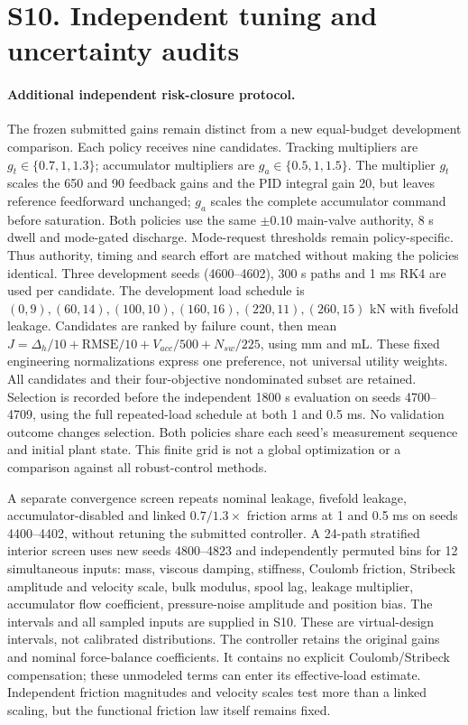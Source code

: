\documentclass[11pt,a4paper]{article}
\begin{document}
\section*{S10. Independent tuning and uncertainty audits}

\paragraph{Additional independent risk-closure protocol.}
The frozen submitted gains remain distinct from a new equal-budget development comparison. Each policy receives nine candidates. Tracking multipliers are $g_t\in\{0.7,1,1.3\}$; accumulator multipliers are $g_a\in\{0.5,1,1.5\}$. The multiplier $g_t$ scales the 650 and 90 feedback gains and the PID integral gain 20, but leaves reference feedforward unchanged; $g_a$ scales the complete accumulator command before saturation. Both policies use the same $\pm0.10$ main-valve authority, 8 s dwell and mode-gated discharge. Mode-request thresholds remain policy-specific. Thus authority, timing and search effort are matched without making the policies identical. Three development seeds (4600--4602), 300 s paths and 1 ms RK4 are used per candidate. The development load schedule is $(0,9),(60,14),(100,10),(160,16),(220,11),(260,15)$ kN with fivefold leakage. Candidates are ranked by failure count, then mean $J=\Delta_h/10+\mathrm{RMSE}/10+V_{acc}/500+N_{sw}/225$, using mm and mL. These fixed engineering normalizations express one preference, not universal utility weights. All candidates and their four-objective nondominated subset are retained. Selection is recorded before the independent 1800 s evaluation on seeds 4700--4709, using the full repeated-load schedule at both 1 and 0.5 ms. No validation outcome changes selection. Both policies share each seed's measurement sequence and initial plant state. This finite grid is not a global optimization or a comparison against all robust-control methods.

A separate convergence screen repeats nominal leakage, fivefold leakage, accumulator-disabled and linked $0.7/1.3\times$ friction arms at 1 and 0.5 ms on seeds 4400--4402, without retuning the submitted controller. A 24-path stratified interior screen uses new seeds 4800--4823 and independently permuted bins for 12 simultaneous inputs: mass, viscous damping, stiffness, Coulomb friction, Stribeck amplitude and velocity scale, bulk modulus, spool lag, leakage multiplier, accumulator flow coefficient, pressure-noise amplitude and position bias. The intervals and all sampled inputs are supplied in S10. These are virtual-design intervals, not calibrated distributions. The controller retains the original gains and nominal force-balance coefficients. It contains no explicit Coulomb/Stribeck compensation; these unmodeled terms can enter its effective-load estimate. Independent friction magnitudes and velocity scales test more than a linked scaling, but the functional friction law itself remains fixed.
\end{document}
